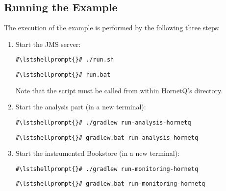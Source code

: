 \setPropertiesListing


\subsection{Running the Example}

 The execution of the example is performed by the following three steps:
\begin{enumerate}
\item Start the JMS server:

\setBashListing
\begin{lstlisting}[caption=Start of the JMS server under UNIX-like systems]
#\lstshellprompt{}# ./run.sh
\end{lstlisting}
\begin{lstlisting}[caption=Start of the JMS server under Windows]
#\lstshellprompt{}# run.bat
\end{lstlisting}

Note that the script must be called from within HornetQ's  directory.

\item Start the analysis part (in a new terminal):
\setBashListing
\begin{lstlisting}[caption=Start the analysis part under UNIX-like systems]
#\lstshellprompt{}# ./gradlew run-analysis-hornetq
\end{lstlisting}
\begin{lstlisting}[caption=Start the analysis part under Windows]
#\lstshellprompt{}# gradlew.bat run-analysis-hornetq
\end{lstlisting}
\item Start the instrumented Bookstore (in a new terminal):
\setBashListing
\begin{lstlisting}[caption=Start the analysis part under UNIX-like systems]
#\lstshellprompt{}# ./gradlew run-monitoring-hornetq
\end{lstlisting}
\begin{lstlisting}[caption=Start the analysis part under Windows]
#\lstshellprompt{}# gradlew.bat run-monitoring-hornetq
\end{lstlisting}
\end{enumerate}

